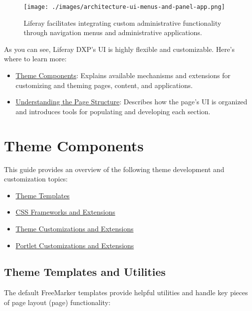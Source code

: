 \begin{figure}
\centering
\texttt{[image: ./images/architecture-ui-menus-and-panel-app.png]}
\caption{Liferay facilitates integrating custom administrative
functionality through navigation menus and administrative applications.}
\end{figure}

As you can see, Liferay DXP's UI is highly flexible and customizable.
Here's where to learn more:

\begin{itemize}
\item
  \href{/docs/7-2/customization/-/knowledge_base/c/theme-components}{Theme
  Components}: Explains available mechanisms and extensions for
  customizing and theming pages, content, and applications.
\item
  \href{/docs/7-2/customization/-/knowledge_base/c/understanding-the-page-structure}{Understanding
  the Page Structure}: Describes how the page's UI is organized and
  introduces tools for populating and developing each section.
\end{itemize}

\chapter{Theme Components}\label{theme-components}

This guide provides an overview of the following theme development and
customization topics:

\begin{itemize}
\tightlist
\item
  \hyperref[theme-templates]{Theme Templates}
\item
  \hyperref[css-frameworks-and-extensions]{CSS Frameworks and
  Extensions}
\item
  \hyperref[theme-customizations-and-extensions]{Theme Customizations
  and Extensions}
\item
  \hyperref[portlet-customizations-and-extensions]{Portlet
  Customizations and Extensions}
\end{itemize}

\section{Theme Templates and
Utilities}\label{theme-templates-and-utilities}

The default FreeMarker templates provide helpful utilities and handle
key pieces of page layout (page) functionality:

